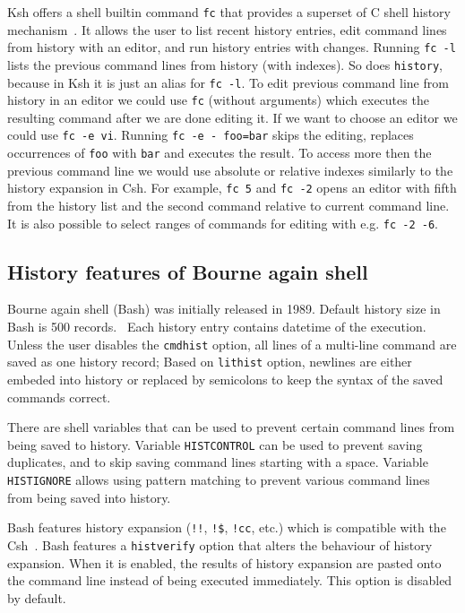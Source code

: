 \documentclass[thesis=M,english]{FITthesis}[2012/10/20]
\let\myCite\cite
\renewcommand\cite{\unskip~\myCite}
\begin{document}
Ksh offers a shell builtin command \verb|fc| that provides a superset of C shell history mechanism\cite{rosenblatt2000kshlearning}. It allows the user to list recent history entries, edit command lines from history with an editor, and run history entries with changes. Running \verb|fc -l| lists the previous command lines from history (with indexes). So does \verb|history|, because in Ksh it is just an alias for \verb|fc -l|. To edit previous command line from history in an editor we could use \verb|fc| (without arguments) which executes the resulting command after we are done editing it. If we want to choose an editor we could use \verb|fc -e vi|. Running \verb|fc -e - foo=bar| skips the editing, replaces occurrences of \verb|foo| with \verb|bar| and executes the result. To access more then the previous command line we would use absolute or relative indexes similarly to the history expansion in Csh. For example, \verb|fc 5| and \verb|fc -2| opens an editor with fifth from the history list and the second command relative to current command line. It is also possible to select ranges of commands for editing with e.g. \verb|fc -2 -6|.



\subsection{History features of Bourne again shell}
Bourne again shell (Bash) was initially released in 1989.
Default history size in Bash is 500 records.\cite{bashman} Each history entry contains datetime of the execution. Unless the user disables the \verb|cmdhist| option, all lines of a multi-line command are saved as one history record; Based on \verb|lithist| option, newlines are either embeded into history or replaced by semicolons to keep the syntax of the saved commands correct. 

There are shell variables that can be used to prevent certain command lines from being saved to history. Variable \verb|HISTCONTROL| can be used to prevent saving duplicates, and to skip saving command lines starting with a space. Variable \verb|HISTIGNORE| allows using pattern matching to prevent various command lines from being saved into history.  

Bash features history expansion (\verb|!!|, \verb|!$|, \verb|!cc|, etc.) which is compatible with the Csh\cite{ramey1994gnubash}.
Bash features a \verb|histverify| option that alters the behaviour of history expansion. When it is enabled, the results of history expansion are  pasted onto the command line instead of being executed immediately. This option is disabled by default. 
\end{document}
